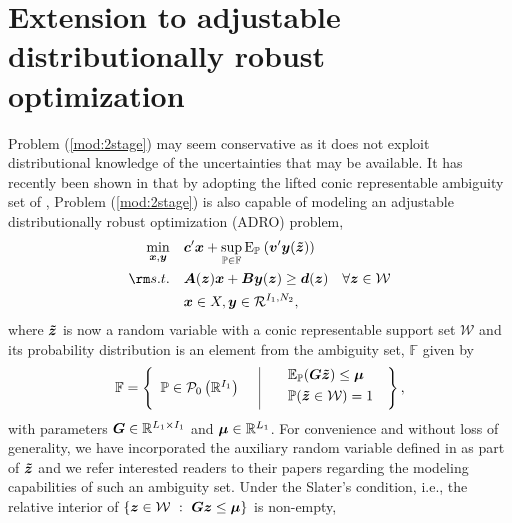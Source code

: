 \documentclass[fleqn,isre,blindrev]{informs4}
\newcommand {\Ep}[2]{{\mathrm{E}_{\mathbb{P}_{#1}} \left( #2 \right)}}
\newcommand {\supEp}[1]{\displaystyle \sup_{\mathbb{P} \in \mathbb{F}} \Ep{}{#1}}
\newcommand{\mb}[1]{\mbox{\boldmath \ensuremath{#1}}}
\newcommand{\mbt}[1]{\mb{\tilde{#1}}}
\renewcommand{\Re}{\mathbb{R}}
\begin{document}
		
		\section{Extension to adjustable distributionally robust optimization} \label{sec:ADRO}
Problem (\ref{mod:2stage}) may seem conservative as it does not exploit distributional knowledge of the uncertainties that may be available. It has recently been shown  in \cite{bsz17} that by adopting the lifted conic representable ambiguity set of  \cite{wks14},  Problem (\ref{mod:2stage}) is also capable of modeling an adjustable distributionally robust optimization (ADRO) problem,    
\begin{equation} \label{mod:d2stage}
			\begin{aligned}
				\min_{\boldsymbol{x}, \boldsymbol{y}} \quad & \mb{c}' \mb{x} + \supEp{  \mb{v}'\mb{y}(\mbt{z} )} \\
				{\rm s.t.}\quad &   \mb{A}(\mb{z})\mb{x}+\mb{B}\mb{y}(\mb{z}) \ge \mb{d}(\mb{z}) & \forall \mb{z} \in \mathcal{W}\\
				&\mb{x} \in X, \mb{y}\in \mathcal{R}^{I_1,N_2},
			\end{aligned}
\end{equation}
		where $\mbt{z}$ is now a random variable with a conic representable support set $\mathcal{W}$ and its probability distribution is an element from the ambiguity set, $\mathbb{F}$ given by 
\begin{equation*}
			\mathbb{F}=\left\{
			\begin{array}{lll}
				\mathbb{P}\in\mathcal{P}_{0}\left(\Re^{I_{1}}\right) \enskip & $\vline$ & \enskip
				\begin{array}{l}
					\mathbb{E}_{\mathbb{P}}(\mb{G}\mbt{z}) \leq \mb{\mu} \vspace{3pt}\\
					\mathbb{P}(\mbt{z}\in\mathcal{W})=1 \vspace{3pt}
				\end{array}
			\end{array}
			\right\},
\end{equation*}
		with  parameters $\mb{G} \in \Re^{L_1 \times I_1}$ and $\mb{\mu} \in \Re^{L_1}$. 
		For convenience and without loss of generality, we have incorporated the auxiliary random variable defined in  \cite{bsz17,wks14} as part of  $\mbt{z}$ and we refer interested readers to their papers regarding the modeling capabilities of such an  ambiguity set. Under the Slater's condition, i.e., the relative interior of $\{ \mb{z} \in \mathcal{W}~:~ \mb{G}\mb{z} \leq \mb{\mu}\}$ is non-empty, 
\end{document}
